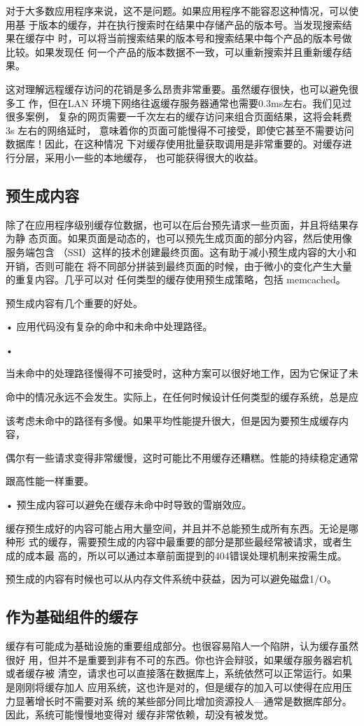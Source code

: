 对于大多数应用程序来说，这不是问题。如果应用程序不能容忍这种情况，可以使用基
于版本的缓存，并在执行搜索时在结果中存储产品的版本号。当发现搜索结果在缓存中
时，可以将当前搜索结果的版本号和搜索结果中每个产品的版本号做比较。如果发现任
何一个产品的版本数据不一致，可以重新搜索并且重新缓存结果。

这对理解远程缓存访问的花销是多么昂贵非常重要。虽然缓存很快，也可以避免很多工
作，但在LAN 环境下网络往返缓存服务器通常也需要0.3ms左右。我们见过很多案例，
复杂的网页需要一千次左右的缓存访问来组合页面结果，这将会耗费3s 左右的网络延时，
意味着你的页面可能慢得不可接受，即使它甚至不需要访问数据库！因此，在这种情况
下对缓存使用批量获取调用是非常重要的。对缓存进行分层，采用小一些的本地缓存，
也可能获得很大的收益。

\subsection{预生成内容}
除了在应用程序级别缓存位数据，也可以在后台预先请求一些页面，并且将结果存为静
态页面。如果页面是动态的，也可以预先生成页面的部分内容，然后使用像服务端包含
（SSI）这样的技术创建最终页面。这有助于减小预生成内容的大小和开销，否则可能在
将不同部分拼装到最终页面的时候，由于微小的变化产生大量的重复内容。几乎可以对
任何类型的缓存使用预生成策略，包括 memcached。

预生成内容有几个重要的好处。

• 应用代码没有复杂的命中和未命中处理路径。

•

当未命中的处理路径慢得不可接受时，这种方案可以很好地工作，因为它保证了未

命中的情况永远不会发生。实际上，在任何时候设计任何类型的缓存系统，总是应

该考虑未命中的路径有多慢。如果平均性能提升很大，但是因为要预生成缓存内容，

偶尔有一些请求变得非常缓慢，这时可能比不用缓存还糟糕。性能的持续稳定通常

跟高性能一样重要。

• 预生成内容可以避免在缓存未命中时导致的雪崩效应。

缓存预生成好的内容可能占用大量空间，并且并不总能预生成所有东西。无论是哪种形
式的缓存，需要预生成的内容中最重要的部分是那些最经常被请求，或者生成的成本最
高的，所以可以通过本章前面提到的404错误处理机制来按需生成。

预生成的内容有时候也可以从内存文件系统中获益，因为可以避免磁盘1/O。

\subsection{作为基础组件的缓存}
缓存有可能成为基础设施的重要组成部分。也很容易陷人一个陷阱，认为缓存虽然很好
用，但并不是重要到非有不可的东西。你也许会辩驳，如果缓存服务器宕机或者缓存被
清空，请求也可以直接落在数据库上，系统依然可以正常运行。如果是刚刚将缓存加人
应用系统，这也许是对的，但是缓存的加入可以使得在应用压力显著增长时不需要对系
统的某些部分同比增加资源投人—通常是数据库部分。因此，系统可能慢慢地变得对
缓存非常依赖，刧没有被发觉。

